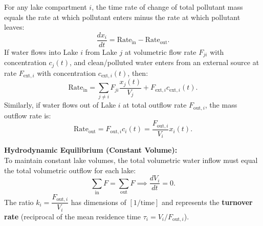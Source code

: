 \documentclass[12pt]{article}
\begin{document}
\begin{thmbox}
For any lake compartment $i$, the time rate of change of total pollutant mass equals the rate at which pollutant enters minus the rate at which pollutant leaves:
\begin{equation}
  \frac{dx_i}{dt} = \text{Rate}_{\text{in}} - \text{Rate}_{\text{out}}.
\end{equation}
If water flows into Lake $i$ from Lake $j$ at volumetric flow rate $F_{ji}$ with concentration $c_j(t)$, and clean/polluted water enters from an external source at rate $F_{\text{ext}, i}$ with concentration $c_{\text{ext}, i}(t)$, then:
\begin{equation}
  \text{Rate}_{\text{in}} = \sum_{j \neq i} F_{ji} \frac{x_j(t)}{V_j} + F_{\text{ext}, i} c_{\text{ext}, i}(t).
\end{equation}
Similarly, if water flows out of Lake $i$ at total outflow rate $F_{\text{out}, i}$, the mass outflow rate is:
\begin{equation}
  \text{Rate}_{\text{out}} = F_{\text{out}, i} c_i(t) = \frac{F_{\text{out}, i}}{V_i} x_i(t).
\end{equation}
\end{thmbox}

\begin{keybox}
\textbf{Hydrodynamic Equilibrium (Constant Volume):}\\
To maintain constant lake volumes, the total volumetric water inflow must equal the total volumetric outflow for each lake:
\[
  \sum_{\text{in}} F = \sum_{\text{out}} F \implies \frac{dV_i}{dt} = 0.
\]
The ratio $k_i = \dfrac{F_{\text{out}, i}}{V_i}$ has dimensions of $[1/\text{time}]$ and represents the \textbf{turnover rate} (reciprocal of the mean residence time $\tau_i = V_i / F_{\text{out}, i}$).
\end{keybox}

\vspace{8pt}
\end{document}
